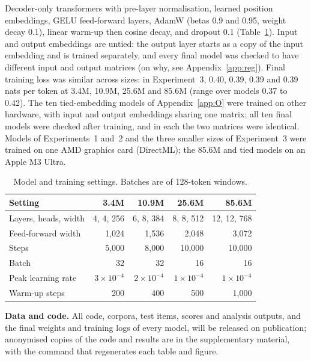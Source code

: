 \FloatBarrier
{}\label{app:train}
\setcounter{table}{0}\renewcommand{\thetable}{\thesection\arabic{table}}
Decoder-only transformers with pre-layer normalisation, learned position embeddings, GELU feed-forward layers, AdamW (betas 0.9 and 0.95, weight decay 0.1), linear warm-up then cosine decay, and dropout 0.1 (Table~\ref{tab:train}). Input and output embeddings are untied: the output layer starts as a copy of the input embedding and is trained separately, and every final model was checked to have different input and output matrices (on why, see Appendix~\ref{app:reg}). Final training loss was similar across sizes: in Experiment~3, 0.40, 0.39, 0.39 and 0.39 nats per token at 3.4M, 10.9M, 25.6M and 85.6M (range over models 0.37 to 0.42). The ten tied-embedding models of Appendix~\ref{app:O} were trained on other hardware, with input and output embeddings sharing one matrix; all ten final models were checked after training, and in each the two matrices were identical. Models of Experiments~1 and~2 and the three smaller sizes of Experiment~3 were trained on one AMD graphics card (DirectML); the 85.6M and tied models on an Apple M3 Ultra.

\begin{table}[!htbp]
\centering\small
\caption{Model and training settings. Batches are of 128-token windows.}
\label{tab:train}
\begin{tabular}{@{}lrrrr@{}}
\toprule
Setting & 3.4M & 10.9M & 25.6M & 85.6M \\
\midrule
Layers, heads, width & 4, 4, 256 & 6, 8, 384 & 8, 8, 512 & 12, 12, 768 \\
Feed-forward width & 1,024 & 1,536 & 2,048 & 3,072 \\
Steps & 5,000 & 8,000 & 10,000 & 10,000 \\
Batch & 32 & 32 & 16 & 16 \\
Peak learning rate & $3\times10^{-4}$ & $2\times10^{-4}$ & $1\times10^{-4}$ & $1\times10^{-4}$ \\
Warm-up steps & 200 & 400 & 500 & 1,000 \\
\bottomrule
\end{tabular}
\end{table}

\textbf{Data and code.} All code, corpora, test items, scores and analysis outputs, and the final weights and training logs of every model, will be released on publication; anonymised copies of the code and results are in the supplementary material, with the command that regenerates each table and figure.

